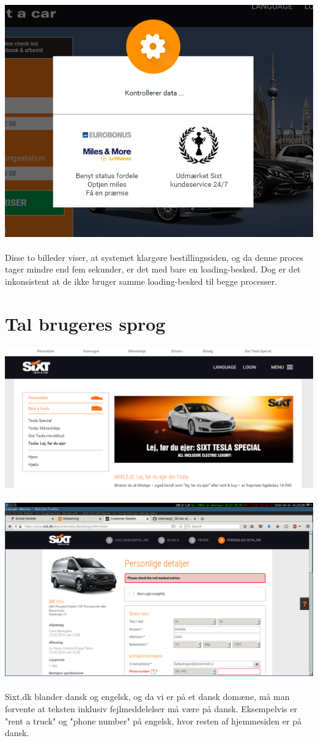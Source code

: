 \documentclass[12pt]{article}
\begin{document}
\includegraphics[scale=0.8]{img/Kontrollerer_Data}
\\
\\
Disse to billeder viser, at systemet klargøre bestillingssiden, og da denne proces tager mindre end fem sekunder, er det med bare en loading-besked. Dog er det inkonsistent at de ikke bruger samme loading-besked til begge processer.

\section{Tal brugeres sprog}
\includegraphics[scale=0.5]{img/Blande_Engelsk_Dansk}
\\
\\
\includegraphics[scale=0.3]{img/CheckRedMarks}
\\
\\
Sixt.dk blander dansk og engelsk, og da vi er på et dansk domæne, må man forvente at teksten inklusiv fejlmeddelelser må være på dansk. Eksempelvis er "rent a truck" og "phone number" på engelsk, hvor resten af hjemmesiden er på dansk.
\end{document}
